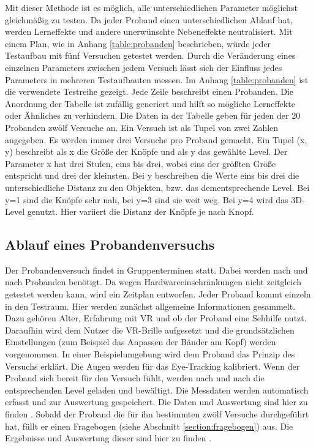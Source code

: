 Mit dieser Methode ist es möglich, alle unterschiedlichen Parameter möglichst gleichmäßig zu testen. Da jeder Proband einen unterschiedlichen Ablauf hat, werden Lerneffekte und andere unerwünschte Nebeneffekte neutralisiert. Mit einem Plan, wie in Anhang \ref{table:probanden} beschrieben, würde jeder Testaufbau mit fünf Versuchen getestet werden. Durch die Veränderung eines einzelnen Parameters zwischen jedem Versuch lässt sich der Einfluss jedes Parameters in mehreren Testaufbauten messen. Im Anhang \ref{table:probanden} ist die verwendete Testreihe gezeigt. Jede Zeile beschreibt einen Probanden. Die Anordnung der Tabelle ist zufällig generiert und hilft so mögliche Lerneffekte oder Ähnliches zu verhindern. Die Daten in der Tabelle geben für jeden der 20 Probanden zwölf Versuche an. Ein Versuch ist als Tupel von zwei Zahlen angegeben. Es werden immer drei Versuche pro Proband gemacht. Ein Tupel (x, y) beschreibt als x die Größe der Knöpfe und als y das gewählte Level. Der Parameter x hat drei Stufen, eins bis drei, wobei eins der größten Größe entspricht und drei der kleinsten. Bei y beschreiben die Werte eins bis drei die unterschiedliche Distanz zu den Objekten, bzw. das dementsprechende Level. Bei y=1 sind die Knöpfe sehr nah, bei y=3 sind sie weit weg. Bei y=4 wird das 3D-Level genutzt. Hier variiert die Distanz der Knöpfe je nach Knopf. 

\subsection{Ablauf eines Probandenversuchs}
Der Probandenversuch findet in Gruppenterminen statt. Dabei werden nach und nach Probanden benötigt. Da wegen Hardwareeinschränkungen nicht zeitgleich getestet werden kann, wird ein Zeitplan entworfen. Jeder Proband kommt einzeln in den Testraum. Hier werden zunächst allgemeine Informationen gesammelt. Dazu gehören Alter, Erfahrung mit VR und ob der Proband eine Sehhilfe nutzt. Daraufhin wird dem Nutzer die VR-Brille aufgesetzt und die grundsätzlichen Einstellungen (zum Beispiel das Anpassen der Bänder am Kopf) werden vorgenommen. In einer Beispielumgebung wird dem Proband das Prinzip des Versuchs erklärt. Die Augen werden für das Eye-Tracking kalibriert. Wenn der Proband sich bereit für den Versuch fühlt, werden nach und nach die entsprechenden Level geladen und bewältigt. Die Messdaten werden automatisch erfasst und zur Auswertung gespeichert. Die Daten und Auswertung sind hier zu finden . Sobald der Proband die für ihn bestimmten zwölf Versuche durchgeführt hat, füllt er einen Fragebogen (siehe Abschnitt \ref{section:fragebogen}) aus. Die Ergebnisse und Auswertung dieser sind hier zu finden .

